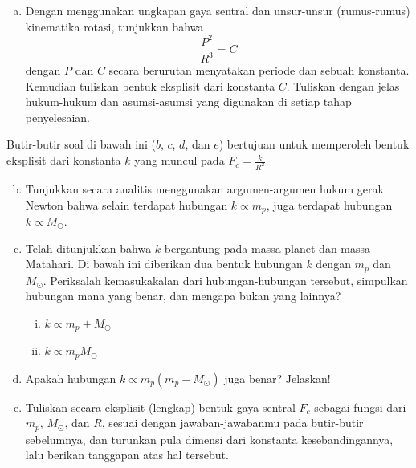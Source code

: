 \documentclass[11pt,fleqn]{exam}
\begin{document}
\begin{questions}
\begin{enumerate}[a.]
    \item Dengan menggunakan ungkapan gaya sentral dan unsur-unsur (rumus-rumus) kinematika rotasi, tunjukkan bahwa 
    \begin{equation*}
        \frac{P^2}{R^3} = C
    \end{equation*}
    dengan $P$ dan $C$ secara berurutan menyatakan periode dan sebuah konstanta. Kemudian tuliskan bentuk eksplisit dari konstanta $C$. Tuliskan dengan jelas hukum-hukum dan asumsi-asumsi yang digunakan di setiap tahap penyelesaian.
\end{enumerate}
Butir-butir soal di bawah ini ($b$, $c$, $d$, dan $e$) bertujuan untuk memperoleh bentuk eksplisit dari konstanta $k$ yang muncul pada $F_c = \frac{k}{R^2}$
\begin{enumerate}[a.]\setcounter{enumi}{1}
    \item Tunjukkan secara analitis menggunakan argumen-argumen hukum gerak Newton bahwa selain terdapat hubungan $k \propto m_p$, juga terdapat hubungan $k \propto M_\odot$.
    \item Telah ditunjukkan bahwa $k$ bergantung pada massa planet dan massa Matahari. Di bawah ini diberikan dua bentuk hubungan $k$ dengan $m_p$ dan $M_\odot$. Periksalah kemasukakalan dari hubungan-hubungan tersebut, simpulkan hubungan mana yang benar, dan mengapa bukan yang lainnya?
    \begin{enumerate}[i.]
        \item $k \propto m_p + M_\odot$
        \item $k \propto m_p M_\odot$
    \end{enumerate}
    \item Apakah hubungan $k \propto m_p(m_p + M_\odot)$ juga benar? Jelaskan!
    \item Tuliskan secara eksplisit (lengkap) bentuk gaya sentral $F_c$ sebagai fungsi dari $m_p$, $M_\odot$, dan $R$, sesuai dengan jawaban-jawabanmu pada butir-butir sebelumnya, dan turunkan pula dimensi dari konstanta kesebandingannya, lalu berikan tanggapan atas hal tersebut.
\end{enumerate}



\end{questions}
\end{document}
